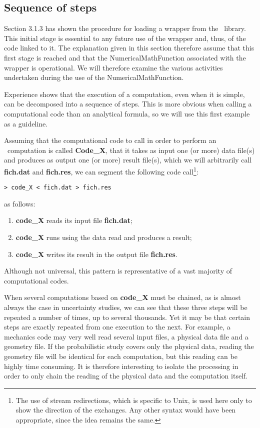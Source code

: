 \subsection{Sequence of steps}

Section 3.1.3 has shown the procedure for loading a wrapper from the \OT\ library. This initial stage is essential to any future use of the wrapper and, thus, of the code linked to it. The explanation given in this section therefore assume that this first stage is reached and that the NumericalMathFunction associated with the wrapper is operational. We will therefore examine the various activities undertaken during the use of the NumericalMathFunction.

Experience shows that the execution of a computation, even when it is simple, can be decomposed into a sequence of steps. This is more obvious when calling a computational code than an analytical formula, so we will use this first example as a guideline.

Assuming that the computational code to call in order to perform an \OT\ computation is called {\bf Code\_X}, that it takes as input one (or more) data file(s) and produces as output one (or more) result file(s), which we will arbitrarily call {\bf fich.dat} and {\bf fich.res}, we can segment the following code call\footnote{The use of stream redirections, which is specific to Unix, is used here only to show the direction of the exchanges. Any other syntax would have been appropriate, since the idea remains the same.}:

\lstset{language=Bash, basicstyle=\normalsize}
\begin{lstlisting}[frame=TBRL]
  > code_X < fich.dat > fich.res
\end{lstlisting}

as follows:
\begin{enumerate}
\item {\bf code\_X} reads its input file {\bf fich.dat};
\item {\bf code\_X} runs using the data read and produces a result;
\item {\bf code\_X} writes its result in the output file {\bf fich.res}.
\end{enumerate}

Although not universal, this pattern is representative of a vast majority of computational codes.

When several computations based on {\bf code\_X} must be chained, as is almost always the case in uncertainty studies, we can see that these three steps will be repeated a number of times, up to several thousands. Yet it may be that certain steps are exactly repeated from one execution to the next. For example, a mechanics code may very well read several input files, a physical data file and a geometry file. If the probabilistic study covers only the physical data, reading the geometry file will be identical for each computation, but this reading can be highly time consuming. It is therefore interesting to isolate the processing in order to only chain the reading of the physical data and the computation itself.

